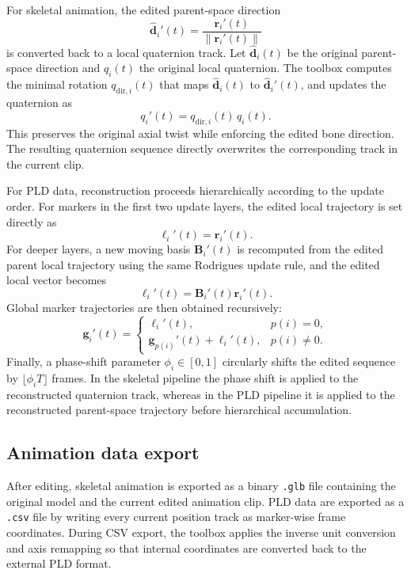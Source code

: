 For skeletal animation, the edited parent-space direction
\begin{equation}
\hat{\mathbf{d}}_i'(t)=\frac{\mathbf{r}_i'(t)}{\|\mathbf{r}_i'(t)\|}
\end{equation}
is converted back to a local quaternion track. Let $\hat{\mathbf{d}}_i(t)$ be the original parent-space direction and $q_i(t)$ the original local quaternion. The toolbox computes the minimal rotation $q_{\mathrm{dir},i}(t)$ that maps $\hat{\mathbf{d}}_i(t)$ to $\hat{\mathbf{d}}_i'(t)$, and updates the quaternion as
\begin{equation}
q_i'(t)=q_{\mathrm{dir},i}(t)\,q_i(t).
\end{equation}
This preserves the original axial twist while enforcing the edited bone direction. The resulting quaternion sequence directly overwrites the corresponding track in the current clip.

For PLD data, reconstruction proceeds hierarchically according to the update order. For markers in the first two update layers, the edited local trajectory is set directly as
\begin{equation}
\boldsymbol{\ell}_i'(t)=\mathbf{r}_i'(t).
\end{equation}
For deeper layers, a new moving basis $\mathbf{B}_i'(t)$ is recomputed from the edited parent local trajectory using the same Rodrigues update rule, and the edited local vector becomes
\begin{equation}
\boldsymbol{\ell}_i'(t)=\mathbf{B}_i'(t)\mathbf{r}_i'(t).
\end{equation}
Global marker trajectories are then obtained recursively:
\begin{equation}
\mathbf{g}_i'(t)=
\begin{cases}
\boldsymbol{\ell}_i'(t), & p(i)=0,\\
\mathbf{g}_{p(i)}'(t)+\boldsymbol{\ell}_i'(t), & p(i)\neq 0.
\end{cases}
\end{equation}
Finally, a phase-shift parameter $\phi_i\in[0,1]$ circularly shifts the edited sequence by $\lfloor \phi_iT\rfloor$ frames. In the skeletal pipeline the phase shift is applied to the reconstructed quaternion track, whereas in the PLD pipeline it is applied to the reconstructed parent-space trajectory before hierarchical accumulation.

\subsection{Animation data export}\label{subsec:methods-export}
After editing, skeletal animation is exported as a binary \texttt{.glb} file containing the original model and the current edited animation clip. PLD data are exported as a \texttt{.csv} file by writing every current position track as marker-wise frame coordinates. During CSV export, the toolbox applies the inverse unit conversion and axis remapping so that internal coordinates are converted back to the external PLD format.

